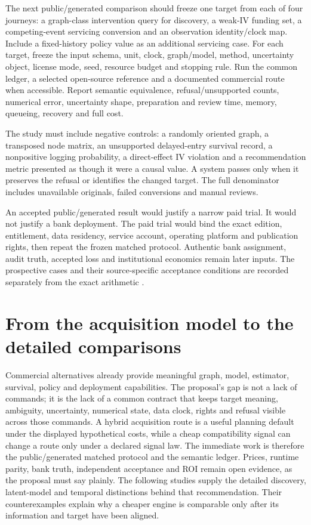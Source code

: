 The next public/generated comparison should freeze one target from each of four
journeys: a graph-class intervention query for discovery, a weak-IV funding set, a
competing-event servicing conversion and an observation identity/clock map.
Include a fixed-history policy value as an additional servicing case. For each target, freeze the
input schema, unit, clock, graph/model, method, uncertainty object, license
mode, seed, resource budget and stopping rule. Run the common ledger, a selected
open-source reference and a documented commercial route when accessible. Report
semantic equivalence, refusal/unsupported counts, numerical error, uncertainty
shape, preparation and review time, memory, queueing, recovery and full cost.

The study must include negative controls: a randomly oriented graph, a
transposed node matrix, an unsupported delayed-entry survival record, a
nonpositive logging probability, a direct-effect IV violation and a recommendation
metric presented as though it were a causal value. A system passes only when it
preserves the refusal or identifies the changed target. The full denominator
includes unavailable originals, failed conversions and manual reviews.

An accepted public/generated result would justify a narrow paid trial. It would
not justify a bank deployment. The paid trial would bind the exact edition,
entitlement, data residency, service account, operating platform and publication
rights, then repeat the frozen matched protocol. Authentic bank assignment,
audit truth, accepted loss and institutional economics remain later inputs.
The prospective cases and their source-specific acceptance conditions are
recorded separately from the exact arithmetic \citep{exec17_s8_design}.

\section{From the acquisition model to the detailed comparisons}
\label{exec17:s8-end}

Commercial alternatives already provide meaningful graph, model, estimator,
survival, policy and deployment capabilities. The proposal's gap is not a lack
of commands; it is the lack of a common contract that keeps target meaning,
ambiguity, uncertainty, numerical state, data clock, rights and refusal visible
across those commands. A hybrid acquisition route is a useful planning default
under the displayed hypothetical costs, while a cheap compatibility signal can
change a route only under a declared signal law. The immediate work is therefore
the public/generated matched protocol and the semantic ledger. Prices, runtime
parity, bank truth, independent acceptance and ROI remain open evidence, as the
proposal must say plainly. The following studies supply the detailed discovery,
latent-model and temporal distinctions behind that recommendation. Their
counterexamples explain why a cheaper engine is comparable only after its
information and target have been aligned.


